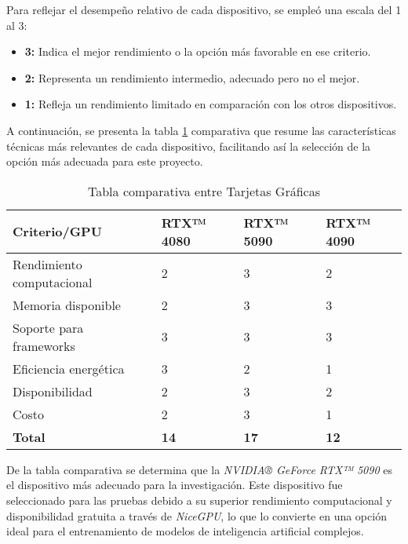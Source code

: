 Para reflejar el desempeño relativo de cada dispositivo, se empleó una escala del 1 al 3:

\begin{itemize}
    \item \textbf{3:} Indica el mejor rendimiento o la opción más favorable en ese criterio.
    \item \textbf{2:} Representa un rendimiento intermedio, adecuado pero no el mejor.
    \item \textbf{1:} Refleja un rendimiento limitado en comparación con los otros dispositivos.
\end{itemize}

A continuación, se presenta la tabla \ref{fig:Elec_GPU} comparativa que resume las características técnicas más relevantes de cada dispositivo, facilitando así la selección de la opción más adecuada para este proyecto.

\begin{table}[H]
\centering
\renewcommand{\arraystretch}{1.2}
\caption{Tabla comparativa entre Tarjetas Gráficas}
\label{fig:Elec_GPU}
\begin{tabular}{|p{4.5cm}|p{2.2cm}|p{2.8cm}|p{2.5cm}|}
\hline
\textbf{Criterio/GPU}         & \textbf{RTX™ 4080} & \textbf{RTX™ 5090} & \textbf{RTX™ 4090} \\ \hline
Rendimiento computacional     & 2                  & 3                  & 2                  \\ \hline
Memoria disponible           & 2                  & 3                  & 3                  \\ \hline
Soporte para frameworks      & 3                  & 3                  & 3                  \\ \hline
Eficiencia energética        & 3                  & 2                  & 1                  \\ \hline
Disponibilidad               & 2                  & 3                  & 2                  \\ \hline
Costo                        & 2                  & 3                  & 1                  \\ \hline
\textbf{Total}               & \textbf{14}        & \textbf{17}        & \textbf{12}        \\ \hline
\end{tabular}
\end{table}

De la tabla comparativa se determina que la \textit{NVIDIA® GeForce RTX™ 5090} es el dispositivo más adecuado para la investigación. Este dispositivo fue seleccionado para las pruebas debido a su superior rendimiento computacional y disponibilidad gratuita a través de \textit{NiceGPU}, lo que lo convierte en una opción ideal para el entrenamiento de modelos de inteligencia artificial complejos.


